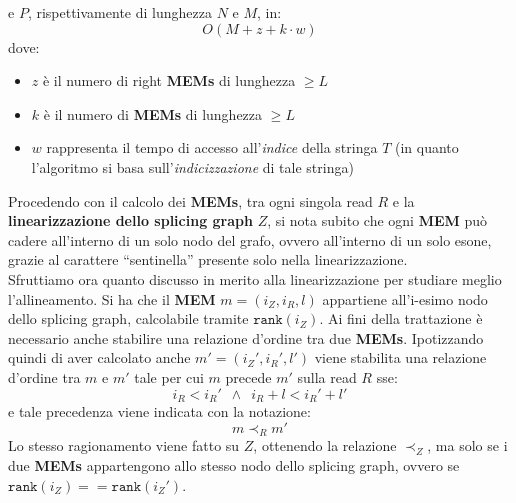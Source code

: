 \documentclass[a4paper,12pt, oneside]{book}
\begin{document}
e $P$, rispettivamente di lunghezza $N$ e $M$, in:  
\[O(M+z+k\cdot w)\]
dove:
\begin{itemize}
  \item $z$ è il numero di right \textbf{MEMs} di lunghezza $\geq L$
  \item $k$ è il numero di \textbf{MEMs} di lunghezza $\geq L$
  \item $w$ rappresenta il tempo di accesso all'\textit{indice} della stringa
  $T$ (in quanto l'algoritmo si basa sull'\textit{indicizzazione} di tale
  stringa) 
\end{itemize}
Procedendo con il calcolo dei \textbf{MEMs}, tra ogni singola read $R$ e la
\textbf{linearizzazione dello splicing graph} $Z$, si nota subito che ogni
\textbf{MEM} può cadere all'interno di un solo nodo del grafo, ovvero
all'interno di un solo esone, grazie al carattere ``sentinella'' presente solo
nella linearizzazione.\\ 
Sfruttiamo ora quanto discusso in merito alla linearizzazione per studiare
meglio l'allineamento. Si ha che il \textbf{MEM} $m=(i_Z, i_R, l)$ appartiene
all'i-esimo nodo dello splicing graph, calcolabile tramite
$\mathtt{rank}(i_Z)$. Ai fini della trattazione è necessario anche stabilire una
relazione d'ordine tra due \textbf{MEMs}. Ipotizzando quindi di aver calcolato
anche $m'=(i_Z',i_R',l')$ viene stabilita una relazione d'ordine tra $m$ e $m'$
tale per cui $m$ precede $m'$ sulla read $R$ sse:
\[i_R<i_R'\,\,\,\land\,\,\, i_R+l<i_R'+l'\]
e tale precedenza viene indicata con la notazione:
\[m\prec_R m'\]
Lo stesso ragionamento viene fatto su $Z$, ottenendo la relazione $\prec_Z$, ma
solo se i due \textbf{MEMs} appartengono allo stesso nodo dello splicing graph,
ovvero se $\mathtt{rank}(i_Z)==\mathtt{rank}(i_Z')$. 
\end{document}
